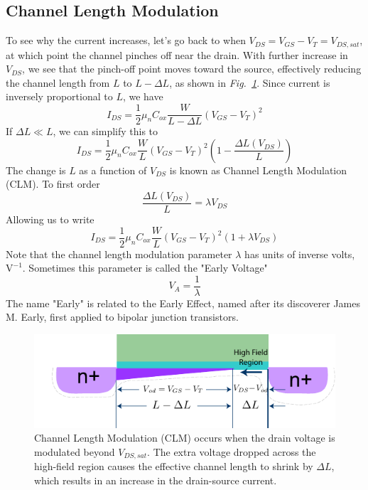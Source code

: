 \subsection{Channel Length Modulation} \label{sec:mos_clm}
To see why the current increases, let's go back to when $V_{DS} = V_{GS} - V_T = V_{DS,sat}$, at which point the channel pinches off near the drain. With further increase in $V_{DS}$, we see that the pinch-off point moves toward the source, effectively reducing the channel length from $L$ to $L-\Delta L$, as shown in \emph{Fig.~\ref{fig:mos_current_sat_clm}}.  Since current is inversely proportional to $L$, we have
    \begin{equation} 
        I_{DS} = \frac{1}{2}{\mu _n}{C_{ox}}\frac{W}{{L - \Delta L}}{\left( {{V_{GS}} - {V_T}} \right)^2} 
    \end{equation}
If $\Delta L \ll L$, we can simplify this to 
    \begin{equation} 
        I_{DS} = \frac{1}{2}{\mu _n}{C_{ox}}\frac{W}{L}{\left( {{V_{GS}} - {V_T}} \right)^2}  \left(1 - \frac{\Delta L(V_{DS})}{L} \right)
    \end{equation}
The change is $L$ as a function of $V_{DS}$ is known as Channel Length Modulation (CLM).  To first order
    \begin{equation} 
        \frac{\Delta L(V_{DS})}{L} = \lambda V_{DS}
    \end{equation}
Allowing us to write
    \begin{equation} 
        I_{DS} = \frac{1}{2}{\mu _n}{C_{ox}}\frac{W}{L}{\left( {{V_{GS}} - {V_T}} \right)^2}\left( {1 + \lambda {V_{DS}}} \right) 
    \end{equation}
Note that the channel length modulation parameter $\lambda$ has units of inverse volts, $\mathrm{V^{-1}}$.  Sometimes this parameter is called the "Early Voltage" 
    \begin{equation} 
        V_A = \frac{1}{\lambda}
    \end{equation}
The name "Early" is related to the Early Effect, named after its discoverer James M. Early, first applied to bipolar junction transistors.  
\begin{figure}[tb]
\centering
\includegraphics[width=.75\columnwidth]{mos_current_sat_clm}
\caption{Channel Length Modulation (CLM) occurs when the drain voltage is modulated beyond $V_{DS,sat}$.  The extra voltage dropped across the high-field region causes the effective channel length to shrink by $\Delta L$, which results in an increase in the drain-source current.}
\label{fig:mos_current_sat_clm}
\end{figure}
